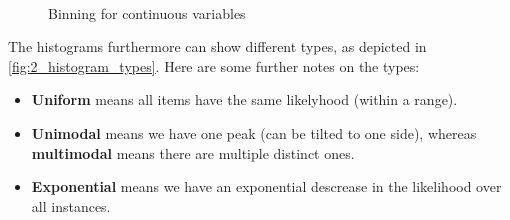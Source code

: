 \begin{figure}[H]
  \centering

  \\\vspace*{0.5cm}
  \hspace*{0.5cm}

  \caption{Binning for continuous variables}
  \label{fig:2_binning}
\end{figure}

The histograms furthermore can show different types, as depicted in \ref{fig:2_histogram_types}. Here are some further notes on the types:
\begin{itemize}
  \item \textbf{Uniform} means all items have the same likelyhood (within a range).
  \item \textbf{Unimodal} means we have one peak (can be tilted to one side), whereas \textbf{multimodal} means there are multiple distinct ones.
  \item \textbf{Exponential} means we have an exponential descrease in the likelihood over all instances.
\end{itemize}

